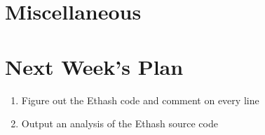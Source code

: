 \documentclass[11pt]{article}
\begin{document}
\section{Miscellaneous}

%
%
\section{Next Week's Plan}
\begin{enumerate}
\item Figure out the Ethash code and comment on every line
\item Output an analysis of the Ethash source code
\end{enumerate}


%
%
\end{document}
